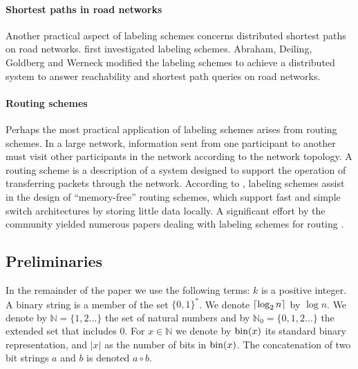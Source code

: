 \paragraph{Shortest paths in road networks}
Another practical aspect of labeling schemes concerns distributed shortest paths  on road networks. 
 first investigated \distance labeling schemes. 
Abraham, Deiling, Goldberg and Werneck  modified the labeling schemes to achieve a distributed system to answer reachability and shortest path queries on road networks.

\paragraph{Routing schemes}
Perhaps the most  practical application of labeling schemes arises from  routing schemes.
In a large network, information sent from one participant  to another must visit   other participants in the network according to the network topology. 
A routing scheme is a description of a  system designed to support the operation of transferring packets through the network.
According to , labeling schemes  assist in the design of ``memory-free'' routing schemes, which support fast and simple switch architectures by  storing  little data locally.
 A significant effort by the community yielded numerous  papers dealing with labeling schemes for routing \cite{Peleg03,Thorup01,Fraigniaud01,gavoille96,Dom07,Korman07K,krioukov2004compact,abraham2006routing,abraham2005name}.





\subsection{Preliminaries}\label{section:preliminaries}
In the remainder of the paper we use the following terms:
			$k$ is a positive integer.
			A binary string is a member of the set $\{ 0,1 \}^*$.
			We denote $\left\lceil{ \log_2{n}}\right\rceil$ by $\log{n}$.   
			We denote by $\mathbb{N} = \{1,2 \dots \} $ the set of natural numbers and by $\mathbb{N}_0 = \{0,1,2 \dots \} $ the extended set that includes $0$.
			For $x \in \mathbb{N}$ we denote by $\operatorname{bin}(x)$ its standard binary representation, and $\vert x \vert$ as the number of bits in $\operatorname{bin}(x)$. 
			The concatenation of two bit strings $a$ and $b$ is denoted $a \circ b$.
